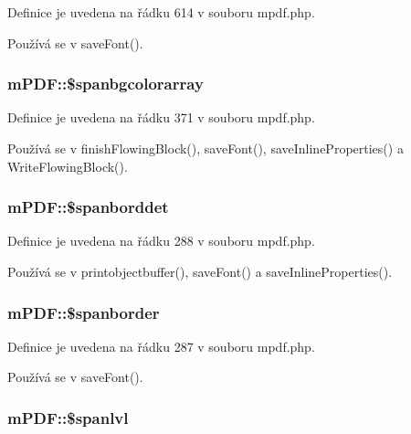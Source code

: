 Definice je uvedena na řádku 614 v souboru mpdf.\-php.



Používá se v save\-Font().

\hypertarget{classm_p_d_f_a2af28b49a83efbb7522ef288e703b1d5}{
\subsubsection[{\$spanbgcolorarray}]{\setlength{\rightskip}{0pt plus 5cm}m\-P\-D\-F\-::\$spanbgcolorarray}}\label{classm_p_d_f_a2af28b49a83efbb7522ef288e703b1d5}


Definice je uvedena na řádku 371 v souboru mpdf.\-php.



Používá se v finish\-Flowing\-Block(), save\-Font(), save\-Inline\-Properties() a Write\-Flowing\-Block().

\hypertarget{classm_p_d_f_a77c01888c86281d62bcc4fcb7a9cdd4d}{
\subsubsection[{\$spanborddet}]{\setlength{\rightskip}{0pt plus 5cm}m\-P\-D\-F\-::\$spanborddet}}\label{classm_p_d_f_a77c01888c86281d62bcc4fcb7a9cdd4d}


Definice je uvedena na řádku 288 v souboru mpdf.\-php.



Používá se v printobjectbuffer(), save\-Font() a save\-Inline\-Properties().

\hypertarget{classm_p_d_f_acc973be801638bb187e7d9ac811652f2}{
\subsubsection[{\$spanborder}]{\setlength{\rightskip}{0pt plus 5cm}m\-P\-D\-F\-::\$spanborder}}\label{classm_p_d_f_acc973be801638bb187e7d9ac811652f2}


Definice je uvedena na řádku 287 v souboru mpdf.\-php.



Používá se v save\-Font().

\hypertarget{classm_p_d_f_a8af1062c4ee9bda5b9a391959925c1f4}{
\subsubsection[{\$spanlvl}]{\setlength{\rightskip}{0pt plus 5cm}m\-P\-D\-F\-::\$spanlvl}}\label{classm_p_d_f_a8af1062c4ee9bda5b9a391959925c1f4}


